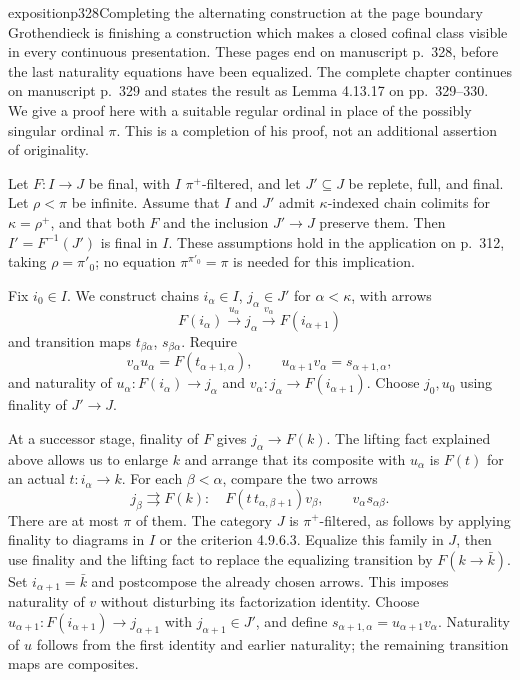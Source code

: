 \begin{dcomment}{exposition}{p328}{Completing the alternating construction at the page boundary}
Grothendieck is finishing a construction which makes a closed cofinal class visible in every continuous presentation. These pages end on manuscript p.~328, before the last naturality equations have been equalized. The complete chapter continues on manuscript p.~329 and states the result as Lemma 4.13.17 on pp.~329--330. We give a proof here with a suitable regular ordinal in place of the possibly singular ordinal $\pi$. This is a completion of his proof, not an additional assertion of originality.

Let $F:I\to J$ be final, with $I$ $\pi^+$-filtered, and let $J'\subseteq J$ be replete, full, and final. Let $\rho<\pi$ be infinite. Assume that $I$ and $J'$ admit $\kappa$-indexed chain colimits for $\kappa=\rho^+$, and that both $F$ and the inclusion $J'\to J$ preserve them. Then $I'=F^{-1}(J')$ is final in $I$. These assumptions hold in the application on p.~312, taking $\rho=\pi'_0$; no equation $\pi^{\pi'_0}=\pi$ is needed for this implication.

Fix $i_0\in I$. We construct chains $i_\alpha\in I$, $j_\alpha\in J'$ for $\alpha<\kappa$, with arrows
\[
 F(i_\alpha)\xrightarrow{u_\alpha}j_\alpha
 \xrightarrow{v_\alpha}F(i_{\alpha+1})
\]
and transition maps $t_{\beta\alpha}$, $s_{\beta\alpha}$. Require
\[
 v_\alpha u_\alpha=F(t_{\alpha+1,\alpha}),\qquad
 u_{\alpha+1}v_\alpha=s_{\alpha+1,\alpha},
\]
and naturality of $u_\alpha:F(i_\alpha)\to j_\alpha$ and $v_\alpha:j_\alpha\to F(i_{\alpha+1})$. Choose $j_0,u_0$ using finality of $J'\to J$.

At a successor stage, finality of $F$ gives $j_\alpha\to F(k)$. The lifting fact explained above allows us to enlarge $k$ and arrange that its composite with $u_\alpha$ is $F(t)$ for an actual $t:i_\alpha\to k$. For each $\beta<\alpha$, compare the two arrows
\[
 j_\beta\rightrightarrows F(k):\quad
 F(t\,t_{\alpha,\beta+1})v_\beta,\qquad
 v_\alpha s_{\alpha\beta}.
\]
There are at most $\pi$ of them. The category $J$ is $\pi^+$-filtered, as follows by applying finality to diagrams in $I$ or the criterion 4.9.6.3. Equalize this family in $J$, then use finality and the lifting fact to replace the equalizing transition by $F(k\to\bar k)$. Set $i_{\alpha+1}=\bar k$ and postcompose the already chosen arrows. This imposes naturality of $v$ without disturbing its factorization identity. Choose $u_{\alpha+1}:F(i_{\alpha+1})\to j_{\alpha+1}$ with $j_{\alpha+1}\in J'$, and define $s_{\alpha+1,\alpha}=u_{\alpha+1}v_\alpha$. Naturality of $u$ follows from the first identity and earlier naturality; the remaining transition maps are composites.


\end{dcomment}
